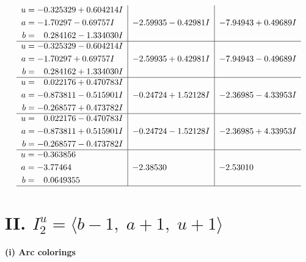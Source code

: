 \documentclass[1p]{elsarticle_modified}
\theoremstyle{definition}
\begin{document}
$$\begin{array}{c|c|c}
\begin{aligned}
u &= -0.325329 + 0.604214 I \\
a &= -1.70297 - 0.69757 I \\
b &= \phantom{-}0.284162 - 1.334030 I\end{aligned}
 & -2.59935 - 0.42981 I & -7.94943 + 0.49689 I \\ \hline\begin{aligned}
u &= -0.325329 - 0.604214 I \\
a &= -1.70297 + 0.69757 I \\
b &= \phantom{-}0.284162 + 1.334030 I\end{aligned}
 & -2.59935 + 0.42981 I & -7.94943 - 0.49689 I \\ \hline\begin{aligned}
u &= \phantom{-}0.022176 + 0.470783 I \\
a &= -0.873811 - 0.515901 I \\
b &= -0.268577 + 0.473782 I\end{aligned}
 & -0.24724 + 1.52128 I & -2.36985 - 4.33953 I \\ \hline\begin{aligned}
u &= \phantom{-}0.022176 - 0.470783 I \\
a &= -0.873811 + 0.515901 I \\
b &= -0.268577 - 0.473782 I\end{aligned}
 & -0.24724 - 1.52128 I & -2.36985 + 4.33953 I \\ \hline\begin{aligned}
u &= -0.363856\phantom{ +0.000000I} \\
a &= -3.77464\phantom{ +0.000000I} \\
b &= \phantom{-}0.0649355\phantom{ +0.000000I}\end{aligned}
 & -2.38530\phantom{ +0.000000I} & -2.53010\phantom{ +0.000000I}\\
 \hline 
 \end{array}$$\newpage\newpage\renewcommand{\arraystretch}{1}
\centering \section*{II. $I^u_{2}= \langle b-1,\;a+1,\;u+1 \rangle$}
\flushleft \textbf{(i) Arc colorings}\\
\end{document}
